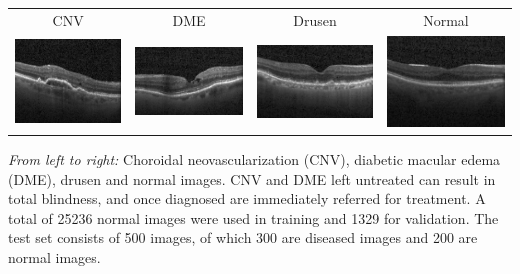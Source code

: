 \documentclass[portrait,final,a0paper,fontscale=0.32]{baposter}
\begin{document}
\begin{poster}
{\begin{center}
     \begin{minipage}{0.95\textwidth}
     \begin{tabular}{cccc}
     CNV & DME & Drusen & Normal \\
     \includegraphics[height=0.15\textwidth]{img/cnv} &
     \includegraphics[height=0.15\textwidth]{img/dme} &
     \includegraphics[height=0.15\textwidth]{img/drusen} &
     \includegraphics[height=0.15\textwidth]{img/normal} 
     \end{tabular}

     \textit{From left to right:} Choroidal neovascularization (CNV), diabetic macular edema (DME), drusen and normal images. CNV and DME left untreated can result in total blindness, and once diagnosed are immediately referred for treatment. 
     A total of 25236 normal images were used in training and 1329 for validation. The test set consists of 500 images, of which 300 are diseased images and 200 are normal images. 
     \vspace{2mm}
     \end{minipage}
    

\end{center}}
\end{poster}
\end{document}
